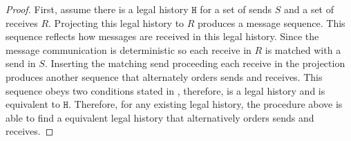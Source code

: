 \begin{proof}
First, assume there is a legal history $\mathtt{H}$ for a set of sends $\mathit{S}$ and a set of receives $\mathit{R}$. 
Projecting this legal history to $\mathit{R}$ produces a message sequence. This sequence reflects how messages are received in this legal history. Since the message communication is deterministic so each receive in $\mathit{R}$ is matched with a send in $\mathit{S}$. Inserting the matching send proceeding each receive in the projection produces another sequence that alternately orders sends and receives. This sequence obeys two conditions stated in , therefore, is a legal history and is equivalent to $\mathtt{H}$.
Therefore, for any existing legal history, the procedure above is able to find a equivalent legal history that alternatively orders sends and receives.  
\end{proof}



 


